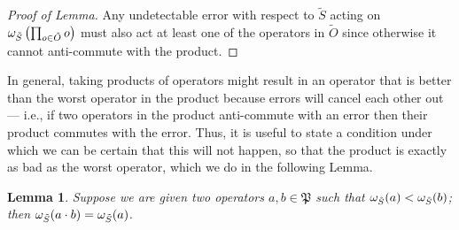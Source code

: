\documentclass[twocolumn,showpacs,preprintnumbers,amsmath,amssymb,nofootinbib,pra,floatfix]{revtex4-1}
\newtheorem{lemma}{Lemma}
\newenvironment{remark}[1][Remark]{\begin{trivlist}
\item[\hskip \labelsep {\bfseries #1}]}{\end{trivlist}}
\newcommand{\set}{\tilde}
\newcommand{\pauligroup}{\mathfrak{P}}
\begin{document}
\begin{proof}[Proof of Lemma]
Any undetectable error with respect to $\set S$ acting on $\om_{\set S}\paren{\prod_{o\in\set O} o}$ must also act at least one of the operators in $\set O$ since otherwise it cannot anti-commute with the product. \end{proof}
\begin{remark}
In general, taking products of operators might result in an operator that is better than the worst operator in the product because errors will cancel each other out --- i.e., if two operators in the product anti-commute with an error then their product commutes with the error.  Thus, it is useful to state a condition under which we can be certain that this will not happen, so that the product is exactly as bad as the worst operator, which we do in the following Lemma.
\end{remark}

\begin{lemma}
\label{lesser-operator-wins}
Suppose we are given two operators $a,b\in\pauligroup$ such that $\om_{\set S}(a)<\om_{\set S}(b)$;  then $\om_{\set S}(a\cdot b) = \om_{\set S}(a)$.
\end{lemma}
\end{document}
